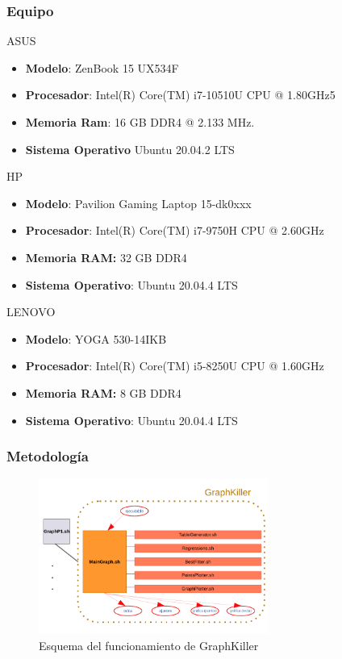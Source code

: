 \documentclass[8pt, aspectratio=169]{beamer}
\begin{document}
	\begin{frame}

        \frametitle{Equipo}

        \begin{block}{ASUS}
			\begin{itemize}
				\item \textbf{Modelo}: ZenBook 15 UX534F
				\item \textbf{Procesador}: Intel(R) Core(TM) i7-10510U CPU @ 1.80GHz5
				\item \textbf{Memoria Ram}: 16 GB DDR4 @ 2.133 MHz.
				\item \textbf{Sistema Operativo} Ubuntu 20.04.2 LTS
			\end{itemize}
		\end{block}
            
        \begin{block}{HP}
            \begin{itemize}
				\item \textbf{Modelo}: Pavilion Gaming Laptop 15-dk0xxx
				\item \textbf{Procesador}: Intel(R) Core(TM) i7-9750H CPU @ 2.60GHz
				\item \textbf{Memoria RAM:} 32 GB DDR4
				\item \textbf{Sistema Operativo}: Ubuntu 20.04.4 LTS
			\end{itemize}
        \end{block}

        \begin{block}{LENOVO}
            \begin{itemize}
				\item \textbf{Modelo}: YOGA 530-14IKB
				\item \textbf{Procesador}: Intel(R) Core(TM) i5-8250U CPU @ 1.60GHz
				\item \textbf{Memoria RAM:} 8 GB DDR4
				\item \textbf{Sistema Operativo}: Ubuntu 20.04.4 LTS
			\end{itemize}
        \end{block}
    \end{frame}

    \begin{frame}
        \frametitle{Metodología}    
        \begin{figure}[H]
			\centering
			\includegraphics[width=0.67\textwidth]{img/esquema_graphkiller.pdf}
			\caption{Esquema del funcionamiento de GraphKiller}
			\label{graph-killer}
		\end{figure}
    \end{frame}
\end{document}
